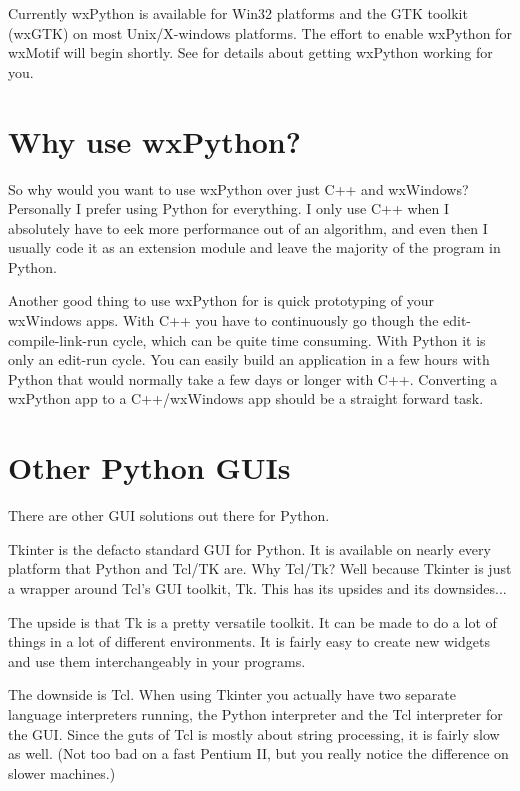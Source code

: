 Currently wxPython is available for Win32 platforms and the GTK
toolkit (wxGTK) on most Unix/X-windows platforms. The effort to
enable wxPython for wxMotif will begin shortly. See  for
details about getting wxPython working for you.

\section{Why use wxPython?}\label{wxpwhy}

So why would you want to use wxPython over just C++ and wxWindows?
Personally I prefer using Python for everything. I only use C++ when
I absolutely have to eek more performance out of an algorithm, and even
then I usually code it as an extension module and leave the majority
of the program in Python.

Another good thing to use wxPython for is quick prototyping of your
wxWindows apps. With C++ you have to continuously go though the
edit-compile-link-run cycle, which can be quite time consuming. With
Python it is only an edit-run cycle. You can easily build an
application in a few hours with Python that would normally take a few
days or longer with C++. Converting a wxPython app to a C++/wxWindows app
should be a straight forward task.

\section{Other Python GUIs}\label{wxpother}

There are other GUI solutions out there for Python.


Tkinter is the defacto standard GUI for Python. It is available
on nearly every platform that Python and Tcl/TK are. Why Tcl/Tk?
Well because Tkinter is just a wrapper around Tcl's GUI toolkit, Tk.
This has its upsides and its downsides...

The upside is that Tk is a pretty versatile toolkit. It can be made
to do a lot of things in a lot of different environments. It is fairly
easy to create new widgets and use them interchangeably in your
programs.

The downside is Tcl. When using Tkinter you actually have two
separate language interpreters running, the Python interpreter and the
Tcl interpreter for the GUI. Since the guts of Tcl is mostly about
string processing, it is fairly slow as well. (Not too bad on a fast
Pentium II, but you really notice the difference on slower machines.)

